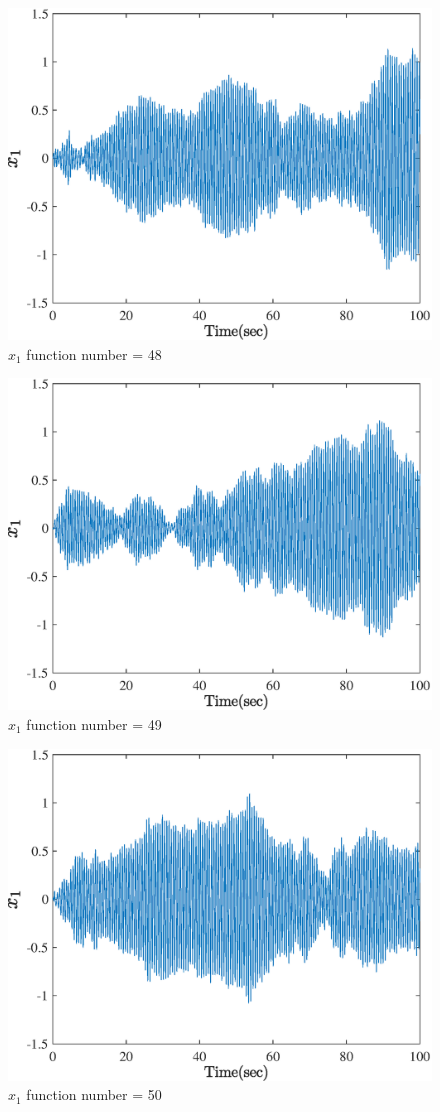  \begin{figure}[H] 
  	\caption{$x_1$ function number = 48} 
  	\centering 
  	\includegraphics[width=12cm]{../Figure/Q5/part_a/48} 
  \end{figure}
  \begin{figure}[H] 
  	\caption{$x_1$ function number = 49} 
  	\centering 
  	\includegraphics[width=12cm]{../Figure/Q5/part_a/49} 
  \end{figure}
  \begin{figure}[H] 
  	\caption{$x_1$ function number = 50} 
  	\centering 
  	\includegraphics[width=12cm]{../Figure/Q5/part_a/50} 
  \end{figure}